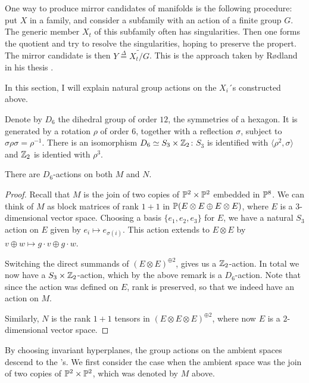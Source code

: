 One way to produce mirror candidates of \CY manifolds is the following procedure: put $X$ in a family, and consider a subfamily with an action of a finite group $G$. The generic member $X_t$ of this subfamily often has singularities. Then one forms the quotient and try to resolve the singularities, hoping to preserve the \CY propert. The mirror candidate is then $Y \stackrel{\Delta}{=}  \widetilde{X_t/G}$. This is the approach taken by Rødland in his thesis \cite{rodland_pfaffian}.

In this section, I will explain natural group actions on the $X_i$´s constructed above.

Denote by $D_6$ the dihedral group of order $12$, the symmetries of a hexagon. It is generated by a rotation $\rho$ of order $6$, together with a reflection $\sigma$, subject to $\sigma \rho \sigma = \rho^{-1}$. There is an isomorphism $D_6 \simeq S_3 \times \Z_2$: $S_3$ is identified with $\langle \rho^2, \sigma \rangle$ and $\Z_2$ is identied with $\rho^3$.

\begin{lemma}
There are $D_6$-actions on both $M$ and $N$.
\end{lemma}
\begin{proof}
Recall that $M$ is the join of two copies of $\P^2 \times \P^2$ embedded in $\P^8$. We can think of $M$ as block matrices of rank $1+1$ in $\P(E \otimes E \oplus E \otimes E)$, where $E$ is a $3$-dimensional vector space. Choosing a basis $\{e_1,e_2,e_3\}$ for $E$, we have a natural $S_3$ action on $E$ given by $e_i \mapsto e_{\sigma(i)}$. This action extends to $E \otimes E$ by $v \oplus w \mapsto g \cdot v \oplus g \cdot w$.  

Switching the direct summands of ${\left(E \otimes E\right)}^{\oplus 2}$, gives us a $\Z_2$-action. In total we now have a $S_3 \times \Z_2$-action, which by the above remark is a $D_6$-action. Note that since the action was defined on $E$, rank is preserved, so that we indeed have an action on $M$.

Similarly, $N$ is the rank $1+1$ tensors in ${\left(E \otimes E \otimes E \right)}^{\oplus 2}$, where now $E$ is a $2$-dimensional vector space. 
\end{proof}


By choosing invariant hyperplanes, the group actions on the ambient spaces descend to the \CY's. We first consider the case when the ambient space was the join of two copies of $\P^2 \times \P^2$, which was denoted by $M$ above.

